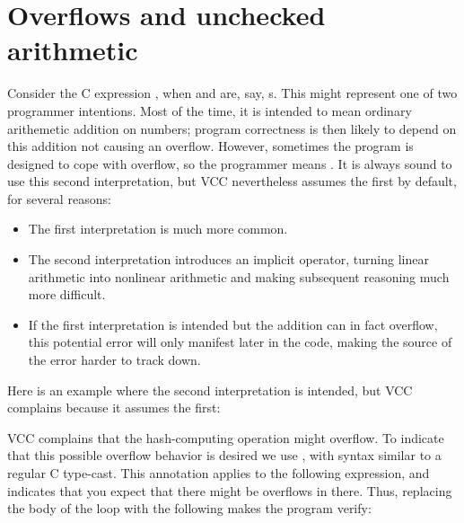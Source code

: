 
\section{Overflows and unchecked arithmetic}
\label{sect:overflows}

Consider the C expression , when  and  are,
say, s. This might represent one of two programmer
intentions. Most of the time, it is intended to mean ordinary
arithemetic addition on numbers; program correctness is then likely to
depend on this addition not causing an overflow. However, sometimes
the program is designed to cope with overflow, so the programmer means
. It is always sound to use this
second interpretation, but VCC nevertheless assumes the first by
default, for several reasons:
\begin{itemize}
\item The first interpretation is much more common.
\item The second interpretation introduces an implicit \vcc{\%}
  operator, turning linear arithmetic into nonlinear arithmetic and
  making subsequent reasoning much more difficult.
\item If the first interpretation is intended but the addition can in
  fact overflow, this potential error will only manifest later in the
  code, making the source of the error harder to track down.
\end{itemize}

Here is an example where the second interpretation is intended, but
VCC complains because it assumes the first:

\noindent
VCC complains that the hash-computing operation might overflow.
To indicate that this possible overflow behavior is desired we use ,
with syntax similar to a regular C type-cast.
This annotation applies to the following expression, and indicates that
you expect that there might be overflows in there.
Thus, replacing the body of the loop with the following
makes the program verify:


